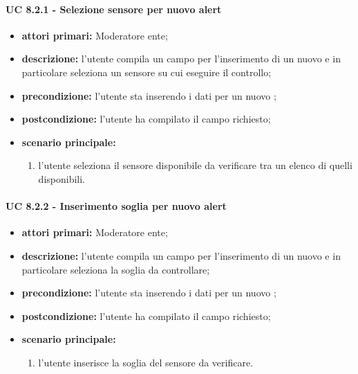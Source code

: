 				\paragraph{UC 8.2.1 - Selezione sensore per nuovo alert}
				\begin{itemize}
					\item \textbf{attori primari:} Moderatore ente;
					\item \textbf{descrizione:} l'utente compila un campo per l'inserimento di un nuovo  e in particolare seleziona un sensore su cui eseguire il controllo;
					\item \textbf{precondizione:} l'utente sta inserendo i dati per un nuovo ;
					\item \textbf{postcondizione:} l'utente ha compilato il campo richiesto;
					\item \textbf{scenario principale:}
					\begin{enumerate}
						\item{l'utente seleziona il sensore disponibile da verificare tra un elenco di quelli disponibili.}
					\end{enumerate}	
				\end{itemize}

				\paragraph{UC 8.2.2 - Inserimento soglia per nuovo alert}
				\begin{itemize}
					\item \textbf{attori primari:} Moderatore ente;
					\item \textbf{descrizione:} l'utente compila un campo per l'inserimento di un nuovo  e in particolare seleziona la soglia da controllare;
					\item \textbf{precondizione:} l'utente sta inserendo i dati per un nuovo ;
					\item \textbf{postcondizione:} l'utente ha compilato il campo richiesto;
					\item \textbf{scenario principale:}
					\begin{enumerate}
						\item{l'utente inserisce la soglia del sensore da verificare.}
					\end{enumerate}	
				\end{itemize}

